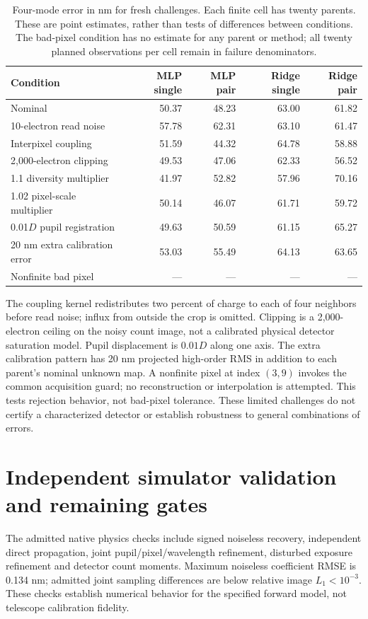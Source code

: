 \documentclass[11pt,a4paper]{article}
\begin{document}
\begin{table}[ht]
\centering\small
\caption{Four-mode error in nm for fresh challenges. Each finite cell has twenty
parents. These are point estimates, rather than tests of differences between
conditions. The bad-pixel condition has no estimate for any parent or method;
all twenty planned observations per cell remain in failure denominators.}
\begin{tabular}{@{}lrrrr@{}}
\toprule
Condition&MLP single&MLP pair&Ridge single&Ridge pair\\
\midrule
Nominal&50.37&48.23&63.00&61.82\\
10-electron read noise&57.78&62.31&63.10&61.47\\
Interpixel coupling&51.59&44.32&64.78&58.88\\
2,000-electron clipping&49.53&47.06&62.33&56.52\\
1.1 diversity multiplier&41.97&52.82&57.96&70.16\\
1.02 pixel-scale multiplier&50.14&46.07&61.71&59.72\\
0.01$D$ pupil registration&49.63&50.59&61.15&65.27\\
20 nm extra calibration error&53.03&55.49&64.13&63.65\\
Nonfinite bad pixel&---&---&---&---\\
\bottomrule
\end{tabular}
\label{tab:challenges}
\end{table}

The coupling kernel redistributes two percent of charge to each of four
neighbors before read noise; influx from outside the crop is omitted.
Clipping is a 2,000-electron ceiling on the noisy count image, not a calibrated
physical detector saturation model. Pupil displacement is $0.01D$ along one
axis. The extra calibration pattern has 20 nm projected high-order RMS in
addition to each parent's nominal unknown map. A nonfinite pixel at index
$(3,9)$ invokes the common acquisition guard; no reconstruction or interpolation
is attempted. This tests rejection behavior, not bad-pixel tolerance.
These limited challenges do not certify a characterized detector or establish
robustness to general combinations of errors.

\section{Independent simulator validation and remaining gates}
The admitted native physics checks include signed noiseless recovery,
independent direct propagation, joint pupil/pixel/wavelength refinement,
disturbed exposure refinement and detector count moments. Maximum noiseless
coefficient RMSE is 0.134 nm; admitted joint sampling differences are below
relative image $L_1<10^{-3}$. These checks establish numerical behavior for the
specified forward model, not telescope calibration fidelity.
\end{document}
